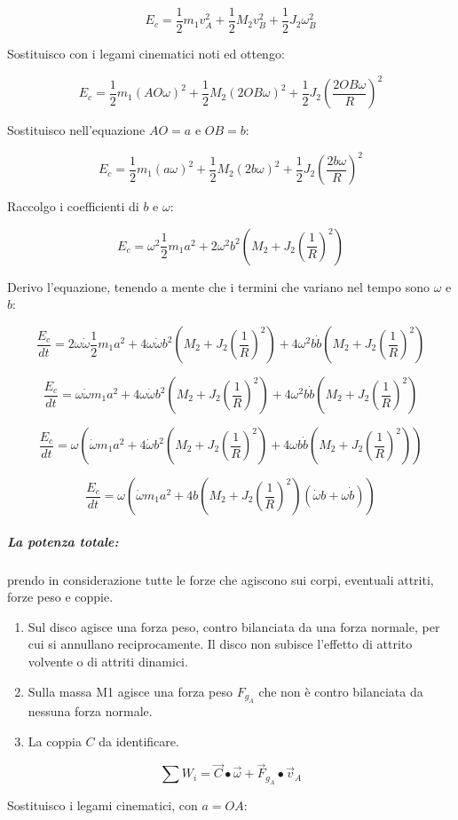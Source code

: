 \documentclass[main.tex]{subfiles}
\begin{document}
\[
	E_c = \frac{1}{2}m_1v_A^2 + \frac{1}{2}M_2v_B^2 + \frac{1}{2}J_2\omega_B^2
\]

Sostituisco con i legami cinematici noti ed ottengo:

\[
	E_c = \frac{1}{2}m_1(AO\omega)^2 + \frac{1}{2}M_2(2OB\omega)^2 + \frac{1}{2}J_2(\frac{2OB\omega}{R})^2
\]

Sostituisco nell'equazione $AO = a$ e $OB = b$:

\[
	E_c = \frac{1}{2}m_1(a\omega)^2 + \frac{1}{2}M_2(2b\omega)^2 + \frac{1}{2}J_2(\frac{2b\omega}{R})^2
\]

Raccolgo i coefficienti di $b$ e $\omega$:

\[
	E_c = \omega^2\frac{1}{2}m_1a^2 + 2\omega^2b^2(M_2 + J_2(\frac{1}{R})^2)
\]

Derivo l'equazione, tenendo a mente che i termini che variano nel tempo sono $\omega$ e $b$:

\[
	\frac{E_c}{dt} =  2\omega\dot{\omega}\frac{1}{2}m_1a^2 + 4\omega\dot{\omega}b^2(M_2 + J_2(\frac{1}{R})^2) + 4\omega^2b\dot{b}(M_2 + J_2(\frac{1}{R})^2)
\]

\[
	\frac{E_c}{dt} =  \omega\dot{\omega}m_1a^2 + 4\omega\dot{\omega}b^2(M_2 + J_2(\frac{1}{R})^2) + 4\omega^2b\dot{b}(M_2 + J_2(\frac{1}{R})^2)
\]

\[
	\frac{E_c}{dt} =  \omega(\dot{\omega}m_1a^2 + 4\dot{\omega}b^2(M_2 + J_2(\frac{1}{R})^2) + 4\omega b\dot{b}(M_2 + J_2(\frac{1}{R})^2))
\]

\[
	\frac{E_c}{dt} =  \omega(\dot{\omega}m_1a^2 + 4b(M_2 + J_2(\frac{1}{R})^2)(\dot{\omega}b + \omega \dot{b}))
\]

\subparagraph{La potenza totale:} prendo in considerazione tutte le forze che agiscono sui corpi, eventuali attriti, forze peso e coppie.

\begin{enumerate}
	\item Sul disco agisce una forza peso, contro bilanciata da una forza normale, per cui si annullano reciprocamente. Il disco non subisce l'effetto di attrito volvente o di attriti dinamici.
	\item Sulla massa M1 agisce una forza peso $F_{g_A}$ che non è contro bilanciata da nessuna forza normale.
	\item La coppia $C$ da identificare.
\end{enumerate}

\[
	\sum W_i = \vec{C}\bullet\vec{\omega} + \vec{F}_{g_A}\bullet{\vec{v}_A}
\]

Sostituisco i legami cinematici, con $a = OA$:
\end{document}
